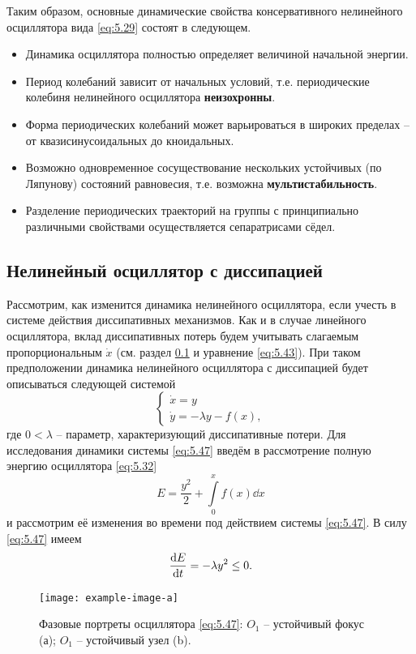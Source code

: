 Таким образом, основные динамические свойства консервативного нелинейного осциллятора вида \eqref{eq:5.29} состоят в следующем.
\begin{itemize}
        \item Динамика осциллятора полностью определяет величиной начальной энергии.
        \item Период колебаний зависит от начальных условий, т.е. периодические колебиня нелинейного осциллятора \textbf{неизохронны}.
        \item Форма периодических колебаний может варьироваться в широких пределах -- от квазисинусоидальных до кноидальных.
        \item Возможно одновременное сосуществование нескольких устойчивых (по Ляпунову) состояний равновесия, т.е. возможна \textbf{мультистабильность}.
\item Разделение периодических траекторий на группы с принципиально различными свойствами осуществляется сепаратрисами сёдел.
\end{itemize}

\subsection{Нелинейный осциллятор с диссипацией}%
\label{sub:5.2.2}

Рассмотрим, как изменится динамика нелинейного осциллятора, если
учесть в системе действия диссипативных механизмов. Как и в случае
линейного осциллятора, вклад диссипативных потерь будем учитывать
слагаемым пропорциональным $\dot x$ (см. раздел \ref{sub:5.2.2} и уравнение \eqref{eq:5.43}). При
таком предположении динамика нелинейного осциллятора с диссипацией будет
описываться следующей системой
\begin{equation}
        \label{eq:5.47}
        \begin{cases}
                \dot x = y\\
                \dot y = - \lambda y - f(x),
        \end{cases}
\end{equation}
где $0< \lambda$ -- параметр, характеризующий диссипативные потери. Для исследования динамики системы \eqref{eq:5.47} введём в рассмотрение полную энергию осциллятора \eqref{eq:5.32}
\begin{equation}
        \label{eq:}
        E = \frac{y^2}{2} + \int\limits_{0}^{x} f(x) \dd{x} 
\end{equation}
и рассмотрим её изменения во времени под действием системы \eqref{eq:5.47}. В силу \eqref{eq:5.47}
имеем
\begin{equation}
        \label{eq:5.48}
        \dv{E}{t} = -\lambda y^2 \leq 0.
\end{equation}
\begin{figure}[h]
        \centering
        \texttt{[image: example-image-a]}
        \caption{Фазовые портреты осциллятора \eqref{eq:5.47}: $O_1$ -- устойчивый фокус (а); $O_1$ -- устойчивый узел (b).}
        \label{fig:5.11}
\end{figure}


